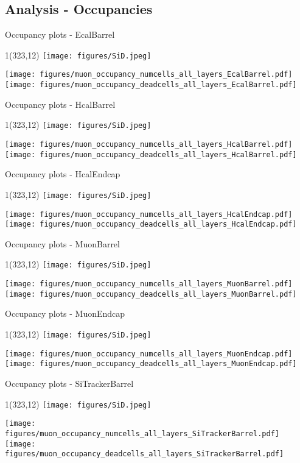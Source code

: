 \documentclass[xcolor={dvipsnames}]{beamer}
\newcommand{\sidlogo}{
  \setlength{\TPHorizModule}{1pt}
  \setlength{\TPVertModule}{1pt}
  \begin{textblock}{1}(323,12)
   \texttt{[image: figures/SiD.jpeg]}
  \end{textblock}
  }
\begin{document}
\subsection*{Analysis - Occupancies}
\begin{frame}{Occupancy plots - \small EcalBarrel}
\sidlogo
 \begin{center}
\texttt{[image: figures/muon\_occupancy\_numcells\_all\_layers\_EcalBarrel.pdf]}
\texttt{[image: figures/muon\_occupancy\_deadcells\_all\_layers\_EcalBarrel.pdf]}
\end{center}
\end{frame}
\begin{frame}{Occupancy plots - \small HcalBarrel}
\sidlogo
 \begin{center}
\texttt{[image: figures/muon\_occupancy\_numcells\_all\_layers\_HcalBarrel.pdf]}
\texttt{[image: figures/muon\_occupancy\_deadcells\_all\_layers\_HcalBarrel.pdf]}
\end{center}
\end{frame}
\begin{frame}{Occupancy plots - \small HcalEndcap}
\sidlogo
 \begin{center}
\texttt{[image: figures/muon\_occupancy\_numcells\_all\_layers\_HcalEndcap.pdf]}
\texttt{[image: figures/muon\_occupancy\_deadcells\_all\_layers\_HcalEndcap.pdf]}
\end{center}
\end{frame}
\begin{frame}{Occupancy plots - \small MuonBarrel}
\sidlogo
 \begin{center}
\texttt{[image: figures/muon\_occupancy\_numcells\_all\_layers\_MuonBarrel.pdf]}
\texttt{[image: figures/muon\_occupancy\_deadcells\_all\_layers\_MuonBarrel.pdf]}
\end{center}
\end{frame}
\begin{frame}{Occupancy plots - \small MuonEndcap}
\sidlogo
 \begin{center}
\texttt{[image: figures/muon\_occupancy\_numcells\_all\_layers\_MuonEndcap.pdf]}
\texttt{[image: figures/muon\_occupancy\_deadcells\_all\_layers\_MuonEndcap.pdf]}
\end{center}
\end{frame}
\begin{frame}{Occupancy plots - \small SiTrackerBarrel}
\sidlogo
 \begin{center}
\texttt{[image: figures/muon\_occupancy\_numcells\_all\_layers\_SiTrackerBarrel.pdf]}
\texttt{[image: figures/muon\_occupancy\_deadcells\_all\_layers\_SiTrackerBarrel.pdf]}
\end{center}
\end{frame}
\end{document}
